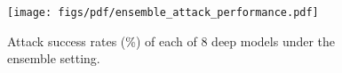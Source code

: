 \begin{figure}
    \centering
    \texttt{[image: figs/pdf/ensemble\_attack\_performance.pdf]}
    \caption{Attack success rates (\%) of each of $8$ deep models under the ensemble setting.  }
    \label{fig:ens_attack}
\end{figure}